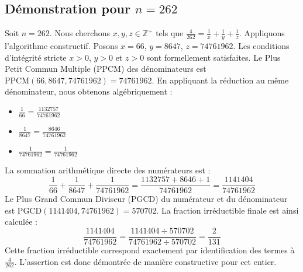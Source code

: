\documentclass[11pt,a4paper]{article}
\begin{document}
\subsection{Démonstration pour $n = 262$}
Soit $n = 262$. Nous cherchons $x, y, z \in \mathbb{Z}^{+}$ tels que $\frac{4}{262} = \frac{1}{x} + \frac{1}{y} + \frac{1}{z}$.
Appliquons l'algorithme constructif. Posons $x = 66$, $y = 8647$, $z = 74761962$.
Les conditions d'intégrité stricte $x > 0$, $y > 0$ et $z > 0$ sont formellement satisfaites.
Le Plus Petit Commun Multiple (PPCM) des dénominateurs est $\text{PPCM}(66, 8647, 74761962) = 74761962$.
En appliquant la réduction au même dénominateur, nous obtenons algébriquement :
\begin{itemize}
    \item $\frac{1}{66} = \frac{1132757}{74761962}$
    \item $\frac{1}{8647} = \frac{8646}{74761962}$
    \item $\frac{1}{74761962} = \frac{1}{74761962}$
\end{itemize}
La sommation arithmétique directe des numérateurs est :
$$ \frac{1}{66} + \frac{1}{8647} + \frac{1}{74761962} = \frac{1132757 + 8646 + 1}{74761962} = \frac{1141404}{74761962} $$
Le Plus Grand Commun Diviseur (PGCD) du numérateur et du dénominateur est $\text{PGCD}(1141404, 74761962) = 570702$.
La fraction irréductible finale est ainsi calculée :
$$ \frac{1141404}{74761962} = \frac{1141404 \div 570702}{74761962 \div 570702} = \frac{2}{131} $$
Cette fraction irréductible correspond exactement par identification des termes à $\frac{4}{262}$. L'assertion est donc démontrée de manière constructive pour cet entier.
\end{document}
